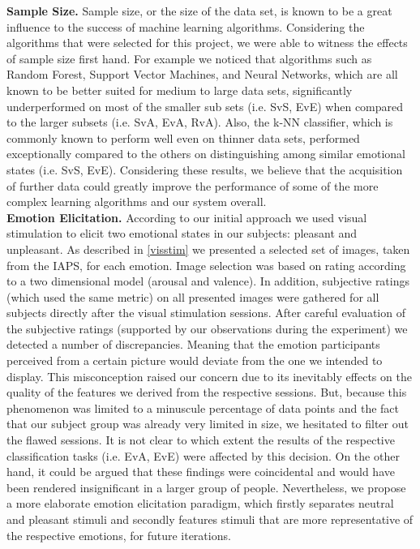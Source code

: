 \textbf{Sample Size.}
Sample size, or the size of the data set, is known to be a great influence to the success of machine learning algorithms. Considering the algorithms that were selected for this project, we were able to witness the effects of sample size first hand. For example we noticed that algorithms such as Random Forest, Support Vector Machines, and Neural Networks, which are all known to be better suited for medium to large data sets, significantly underperformed on most of the smaller sub sets (i.e. SvS, EvE) when compared to the larger subsets (i.e. SvA, EvA, RvA). Also, the k-NN classifier, which is commonly known to perform well even on thinner data sets, performed exceptionally compared to the others on distinguishing among similar emotional states (i.e. SvS, EvE). Considering these results, we believe that the acquisition of further data could greatly improve the performance of some of the more complex learning algorithms and our system overall.\\[10pt]
\textbf{Emotion Elicitation.}
According to our initial approach we used visual stimulation to elicit two emotional states in our subjects: pleasant and unpleasant. As described in \ref{visstim} we presented a selected set of images, taken from the IAPS, for each emotion. Image selection was based on rating according to a two dimensional model (arousal and valence). In addition, subjective ratings (which used the same metric) on all presented images were gathered for all subjects directly after the visual stimulation sessions. After careful evaluation of the subjective ratings (supported by our observations during the experiment) we detected a number of discrepancies. Meaning that the emotion participants perceived from a certain picture would deviate from the one we intended to display. This misconception raised our concern due to its inevitably effects on the quality of the features we derived from the respective sessions. But, because this phenomenon was limited to a minuscule percentage of data points and the fact that our subject group was already very limited in size, we hesitated to filter out the flawed sessions. It is not clear to which extent the results of the respective classification tasks (i.e. EvA, EvE) were affected by this decision. On the other hand, it could be argued that these findings were coincidental and would have been rendered insignificant in a larger group of people. Nevertheless, we propose a more elaborate emotion elicitation paradigm, which firstly separates neutral and pleasant stimuli and secondly features stimuli that are more representative of the respective emotions, for future iterations.\\[10pt]
